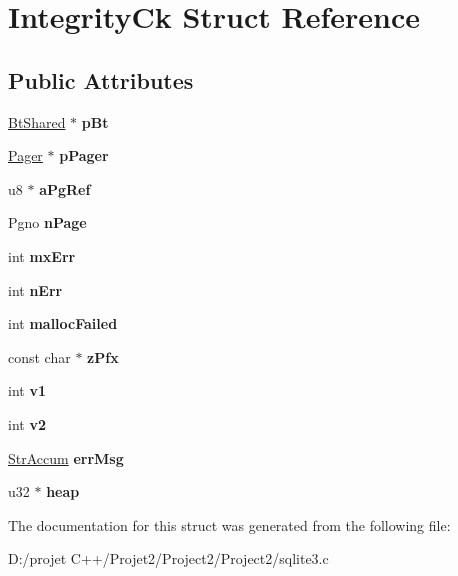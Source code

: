 \hypertarget{struct_integrity_ck}{}\section{Integrity\+Ck Struct Reference}
\label{struct_integrity_ck}
\subsection*{Public Attributes}
\begin{DoxyCompactItemize}
\item 
\mbox{\label{struct_integrity_ck_a65f03f54514f504bd871bb2ccd3da188}} 
\mbox{\hyperlink{struct_bt_shared}{Bt\+Shared}} $\ast$ {\bfseries p\+Bt}
\item 
\mbox{\label{struct_integrity_ck_a87e7f8b012b61b61fae359269cbacce4}} 
\mbox{\hyperlink{struct_pager}{Pager}} $\ast$ {\bfseries p\+Pager}
\item 
\mbox{\label{struct_integrity_ck_a317f80aef5842ad69df75b55e14118d1}} 
u8 $\ast$ {\bfseries a\+Pg\+Ref}
\item 
\mbox{\label{struct_integrity_ck_a04f496ef7239aea6dccb6a861bb5a798}} 
Pgno {\bfseries n\+Page}
\item 
\mbox{\label{struct_integrity_ck_a9daa97cdcb1366c503451ab2af9e7ba6}} 
int {\bfseries mx\+Err}
\item 
\mbox{\label{struct_integrity_ck_a52c815a1d19be87d0ab4dc0a4e4d38e2}} 
int {\bfseries n\+Err}
\item 
\mbox{\label{struct_integrity_ck_a8e448c1d6483a0326a7ec39291782030}} 
int {\bfseries malloc\+Failed}
\item 
\mbox{\label{struct_integrity_ck_a126e42d437777815b1c1d74bcacb3b38}} 
const char $\ast$ {\bfseries z\+Pfx}
\item 
\mbox{\label{struct_integrity_ck_a94edb493175bd0c1862efbaeaff63be3}} 
int {\bfseries v1}
\item 
\mbox{\label{struct_integrity_ck_a0dd13b39fb4fd4e42de8ebf05af5c287}} 
int {\bfseries v2}
\item 
\mbox{\label{struct_integrity_ck_a1e9b79bb1d7b22a840001333200a950e}} 
\mbox{\hyperlink{struct_str_accum}{Str\+Accum}} {\bfseries err\+Msg}
\item 
\mbox{\label{struct_integrity_ck_aada31529ac9fd90643f22cbb79cd916a}} 
u32 $\ast$ {\bfseries heap}
\end{DoxyCompactItemize}


The documentation for this struct was generated from the following file\+:\begin{DoxyCompactItemize}
\item 
D\+:/projet C++/\+Projet2/\+Project2/\+Project2/sqlite3.\+c\end{DoxyCompactItemize}
